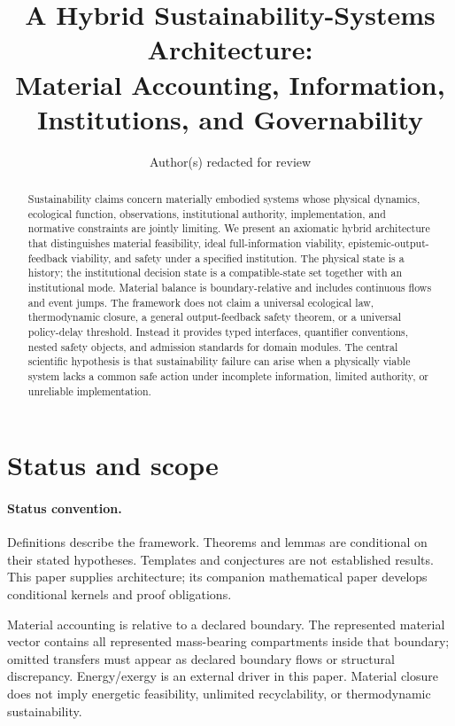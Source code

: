 \documentclass[11pt]{article}
\title{A Hybrid Sustainability-Systems Architecture:\\Material Accounting, Information, Institutions, and Governability}
\author{Author(s) redacted for review}
\date{}
\begin{document}
\maketitle

\begin{abstract}
Sustainability claims concern materially embodied systems whose physical dynamics, ecological function, observations, institutional authority, implementation, and normative constraints are jointly limiting. We present an axiomatic hybrid architecture that distinguishes material feasibility, ideal full-information viability, epistemic-output-feedback viability, and safety under a specified institution. The physical state is a history; the institutional decision state is a compatible-state set together with an institutional mode. Material balance is boundary-relative and includes continuous flows and event jumps. The framework does not claim a universal ecological law, thermodynamic closure, a general output-feedback safety theorem, or a universal policy-delay threshold. Instead it provides typed interfaces, quantifier conventions, nested safety objects, and admission standards for domain modules. The central scientific hypothesis is that sustainability failure can arise when a physically viable system lacks a common safe action under incomplete information, limited authority, or unreliable implementation.
\end{abstract}

\section{Status and scope}
\paragraph{Status convention.} Definitions describe the framework. Theorems and lemmas are conditional on their stated hypotheses. Templates and conjectures are not established results. This paper supplies architecture; its companion mathematical paper develops conditional kernels and proof obligations.

Material accounting is relative to a declared boundary. The represented material vector contains all represented mass-bearing compartments inside that boundary; omitted transfers must appear as declared boundary flows or structural discrepancy. Energy/exergy is an external driver in this paper. Material closure does not imply energetic feasibility, unlimited recyclability, or thermodynamic sustainability.
\end{document}
